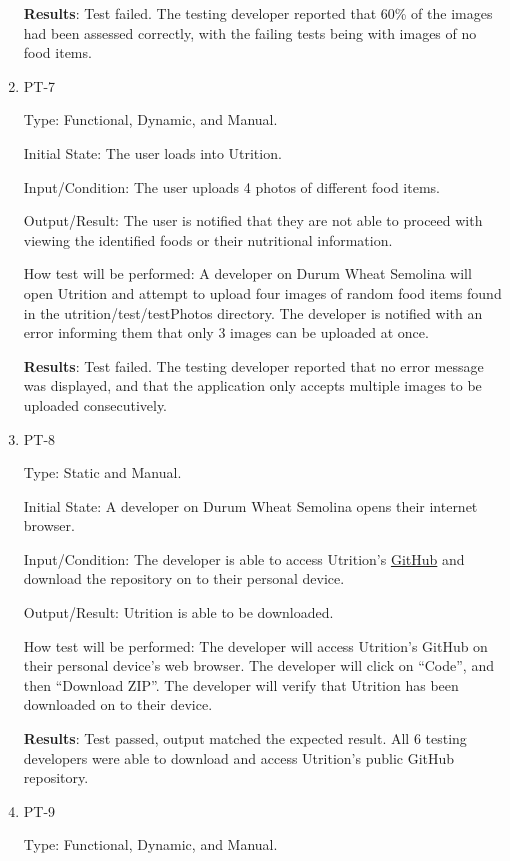 \documentclass[12pt, titlepage]{article}
\begin{document}
\begin{enumerate}
		\textbf{Results}: Test failed. The testing developer reported that  60\% of the images had been assessed correctly, with the failing tests being with images of no food items.
		
		\item{PT-7} 
		
		Type: Functional, Dynamic, and Manual.
		
		Initial State: The user loads into Utrition.
		
		Input/Condition: The user uploads 4 photos of different food items.
		
		Output/Result: The user is notified that they are not able to proceed with viewing the identified foods or their nutritional information.
		
		How test will be performed: A developer on Durum Wheat Semolina will open Utrition and attempt to upload four images of random food items found in the utrition/test/testPhotos directory. The developer is notified with an error informing them that only 3 images can be uploaded at once.
		
		\textbf{Results}: Test failed. The testing developer reported that no error message was displayed, and that the application only accepts multiple images to be uploaded consecutively.
		
		\item{PT-8} 
		
		Type: Static and Manual.
		
		Initial State: A developer on Durum Wheat Semolina opens their internet browser.
		
		Input/Condition: The developer is able to access Utrition’s  \href{https://github.com/jeff-rey-wang/utrition}{GitHub} and download the repository on to their personal device.
		
		Output/Result: Utrition is able to be downloaded.
		
		How test will be performed: The developer will access Utrition’s GitHub on their personal device’s web browser. The developer will click on “Code”, and then “Download ZIP”. The developer will verify that Utrition has been downloaded on to their device.
		
		\textbf{Results}: Test passed, output matched the expected result. All 6 testing developers were able to download and access Utrition's public GitHub repository.
		
		\item{PT-9} 
		
		Type: Functional, Dynamic, and Manual.
		

\end{enumerate}
\end{document}
